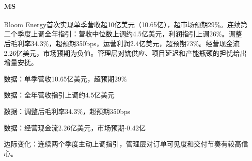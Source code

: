 \documentclass[11pt]{ctexart}
\begin{document}
\paragraph{MS} Bloom Energy首次实现单季营收超10亿美元（10.65亿），超市场预期29\%。连续第二个季度上调全年指引：营收中位数上调约4.5亿美元，利润指引上调26\%。调整后毛利率34.3\%，超预期350bps，运营利润2.4亿美元，超预期73\%。经营现金流2.26亿美元，市场预期为负值。管理层对钪供应、项目延迟和产能瓶颈的担忧给出增量安抚。
{\small\color{refgray}数据：单季营收10.65亿美元，超预期29\%\par}
{\small\color{refgray}数据：全年营收指引上调约4.5亿美元\par}
{\small\color{refgray}数据：调整后毛利率34.3\%，超预期350bps\par}
{\small\color{refgray}数据：经营现金流2.26亿美元，市场预期-0.42亿\par}
{\small\color{refgray}边际变化：连续两个季度主动上调指引，管理层对订单可见度和交付节奏有较高信心。\par}
\end{document}

